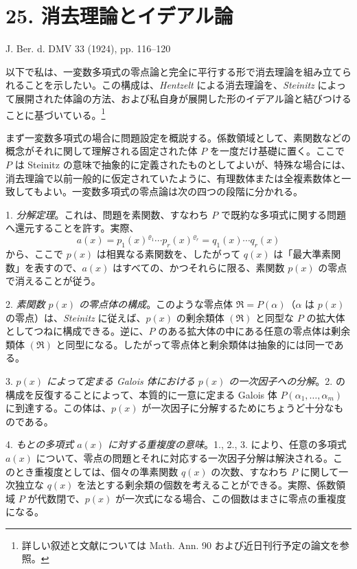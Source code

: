 \documentclass[11pt]{article}
\begin{document}
\section*{25. 消去理論とイデアル論}

\begin{center}
J. Ber. d. DMV 33 (1924), pp. 116--120
\end{center}

以下で私は、一変数多項式の零点論と完全に平行する形で消去理論を組み立てられることを示したい。この構成は、\emph{Hentzelt} による消去理論を、\emph{Steinitz} によって展開された体論の方法、および私自身が展開した形のイデアル論と結びつけることに基づいている。\footnote{詳しい叙述と文献については Math. Ann. 90 および近日刊行予定の論文を参照。}

まず一変数多項式の場合に問題設定を概説する。係数領域として、素関数などの概念がそれに関して理解される固定された体 $P$ を一度だけ基礎に置く。ここで $P$ は Steinitz の意味で抽象的に定義されたものとしてよいが、特殊な場合には、消去理論で以前一般的に仮定されていたように、有理数体または全複素数体と一致してもよい。一変数多項式の零点論は次の四つの段階に分かれる。

1. \emph{分解定理}。これは、問題を素関数、すなわち $P$ で既約な多項式に関する問題へ還元することを許す。実際、
\[
 a(x)=p_1(x)^{\varrho_1}\cdots p_r(x)^{\varrho_r}=q_1(x)\cdots q_r(x)
\]
から、ここで $p(x)$ は相異なる素関数を、したがって $q(x)$ は「最大準素関数」を表すので、$a(x)$ はすべての、かつそれらに限る、素関数 $p(x)$ の零点で消えることが従う。

2. \emph{素関数 $p(x)$ の零点体の構成}。このような零点体 $\mathfrak R=P(\alpha)$（$\alpha$ は $p(x)$ の零点）は、\emph{Steinitz} に従えば、$p(x)$ の剰余類体 $(\mathfrak R)$ と同型な $P$ の拡大体としてつねに構成できる。逆に、$P$ のある拡大体の中にある任意の零点体は剰余類体 $(\mathfrak R)$ と同型になる。したがって零点体と剰余類体は抽象的には同一である。

3. \emph{$p(x)$ によって定まる Galois 体における $p(x)$ の一次因子への分解}。2. の構成を反復することによって、本質的に一意に定まる Galois 体 $P(\alpha_1,\ldots,\alpha_m)$ に到達する。この体は、$p(x)$ が一次因子に分解するためにちょうど十分なものである。

4. \emph{もとの多項式 $a(x)$ に対する重複度の意味}。1., 2., 3. により、任意の多項式 $a(x)$ について、零点の問題とそれに対応する一次因子分解は解決される。このとき重複度としては、個々の準素関数 $q(x)$ の次数、すなわち $P$ に関して一次独立な $q(x)$ を法とする剰余類の個数を考えることができる。実際、係数領域 $P$ が代数閉で、$p(x)$ が一次式になる場合、この個数はまさに零点の重複度になる。
\end{document}
